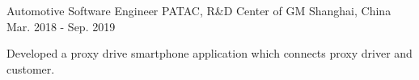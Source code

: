 

\begin{cventries}

  \cventry
    {Automotive Software Engineer} %
    {PATAC, R\&D Center of GM} %
    {Shanghai, China} %
    {Mar. 2018 - Sep. 2019} %
    {
      \begin{cvitems} %
        \item {Developed a proxy drive smartphone application which connects proxy driver and customer.}
      \end{cvitems}
    }
\end{cventries}

